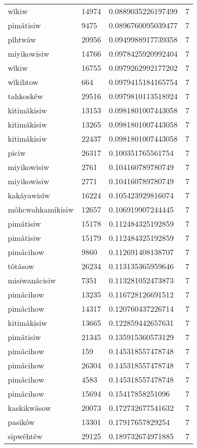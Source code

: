 \begin{longtable}{llll}
wîkiw & 14974 & 0.0889035226197499 & 7 \\
pimâtisiw & 9475 & 0.0896760095039477 & 7 \\
pîhtwâw & 20956 & 0.0949988917739358 & 7 \\
miyikowisiw & 14766 & 0.0978425920992404 & 7 \\
wîkiw & 16755 & 0.0979262992177202 & 7 \\
wîkihtow & 664 & 0.0979415184165754 & 7 \\
tahkoskêw & 29516 & 0.0979810113518924 & 7 \\
kitimâkisiw & 13153 & 0.0981801007443058 & 7 \\
kitimâkisiw & 13265 & 0.0981801007443058 & 7 \\
kitimâkisiw & 22437 & 0.0981801007443058 & 7 \\
piciw & 26317 & 0.100351765561754 & 7 \\
miyikowisiw & 2761 & 0.104160789780749 & 7 \\
miyikowisiw & 2771 & 0.104160789780749 & 7 \\
kakâyawisîw & 16224 & 0.105423929816074 & 7 \\
môhcwahkamikisiw & 12657 & 0.106919907244445 & 7 \\
pimâtisiw & 15178 & 0.112484325192859 & 7 \\
pimâtisiw & 15179 & 0.112484325192859 & 7 \\
pimâcihow & 9860 & 0.112691408138707 & 7 \\
tôtâsow & 26234 & 0.113135365959646 & 7 \\
misiwanâcisiw & 7351 & 0.113281052473873 & 7 \\
pimâcihow & 13235 & 0.116728126691512 & 7 \\
pimâcihow & 14317 & 0.120760437226714 & 7 \\
kitimâkisiw & 13665 & 0.122859442657631 & 7 \\
pimâtisiw & 21345 & 0.135915360573129 & 7 \\
pimâcihow & 159 & 0.145318557478748 & 7 \\
pimâcihow & 26304 & 0.145318557478748 & 7 \\
pimâcihow & 4583 & 0.145318557478748 & 7 \\
pimâcihow & 15694 & 0.15417858251096 & 7 \\
kaskikwâsow & 20073 & 0.172732677541632 & 7 \\
pasikôw & 13301 & 0.17917657829254 & 7 \\
sipwêhtêw & 29125 & 0.189732674971885 & 7 \\

\end{longtable}
